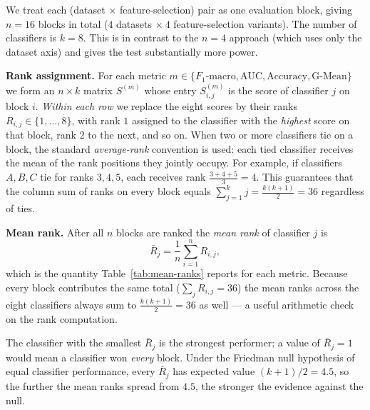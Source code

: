 We treat each (dataset $\times$ feature-selection) pair as one
evaluation block, giving $n=16$ blocks in total
($4$ datasets $\times\ 4$ feature-selection variants).
The number of classifiers is $k=8$. This is in contrast to the
$n=4$ approach (which uses only the dataset axis) and gives the
test substantially more power.

\textbf{Rank assignment.}  For each metric $m\in\{F_1\text{-macro},
\text{AUC},\text{Accuracy},\text{G-Mean}\}$ we form an
$n\times k$ matrix $S^{(m)}$ whose entry
$S^{(m)}_{i,j}$ is the score of classifier $j$ on block $i$. \emph{Within
each row} we replace the eight scores by their ranks $R_{i,j}\in\{1,
\ldots,8\}$, with rank $1$ assigned to the classifier with the
\emph{highest} score on that block, rank $2$ to the next, and so on.
When two or more classifiers tie on a block, the standard
\emph{average-rank} convention is used: each tied classifier receives
the mean of the rank positions they jointly occupy.  For example,
if classifiers $A, B, C$ tie for ranks $3,4,5$, each receives rank
$\tfrac{3+4+5}{3}=4$.  This guarantees that the column sum of ranks
on every block equals $\sum_{j=1}^{k} j = \tfrac{k(k+1)}{2}=36$
regardless of ties.

\textbf{Mean rank.}  After all $n$ blocks are ranked the
\emph{mean rank} of classifier $j$ is
\begin{equation}
\bar{R}_{j}=\frac{1}{n}\sum_{i=1}^{n} R_{i,j},
\tag{5.0}
\label{eq:mean-rank}
\end{equation}
which is the quantity Table~\ref{tab:mean-ranks} reports for each
metric.  Because every block contributes the same total ($\sum_j
R_{i,j}=36$) the mean ranks across the eight classifiers always
sum to $\tfrac{k(k+1)}{2}=36$ as well --- a useful arithmetic check
on the rank computation.

The classifier with the smallest $\bar R_j$ is the strongest
performer; a value of $\bar R_j=1$ would mean a classifier won
\emph{every} block.  Under the Friedman null hypothesis of equal
classifier performance, every $\bar R_j$ has expected value
$(k+1)/2=4.5$, so the further the mean ranks spread from $4.5$,
the stronger the evidence against the null.

